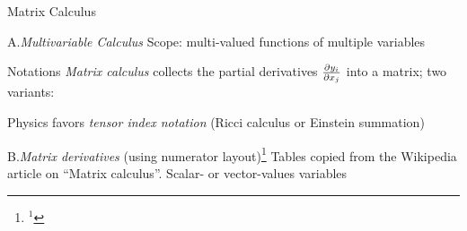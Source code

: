 

\beginsection Matrix Calculus

\item{A.}\emph{Multivariable Calculus}
 Scope: multi-valued functions of multiple variables\medskip

\itemitem{}\vbox{\offinterlineskip
}

 Notations
\emph{Matrix calculus} collects the partial derivatives
${\partial y_i\over\partial x_j}$ into a matrix; two variants:\smallskip

\itemitemitem{}\vbox{\offinterlineskip
}

 Physics favors \emph{tensor index notation} (Ricci calculus or
Einstein summation)\smallskip
\item{B.}\emph{Matrix derivatives} (using numerator layout)\footnote{${}^1$}{
Tables copied from the Wikipedia article on ``Matrix calculus''.}
Scalar- or vector-values variables\medskip

